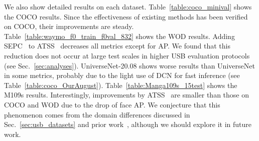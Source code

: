 \documentclass[10pt,twocolumn,letterpaper]{article}
\newcommand{\OurOrig}{UniverseNet\xspace}
\newcommand{\OurAugust}{UniverseNet-20.08\xspace}
\newcommand{\APL}{AP\xspace}
\newcommand{\MangasAbbr}{M109s\xspace}
\begin{document}
We also show detailed results on each dataset.
Table~\ref{table:coco_minival} shows the COCO results.
Since the effectiveness of existing methods has been verified on COCO,
their improvements are steady.
Table~\ref{table:waymo_f0_train_f0val_832} shows the WOD results.
Adding SEPC~\cite{SEPC_CVPR2020} to ATSS~\cite{ATSS_CVPR2020} decreases all metrics except for \APL.
We found that this reduction does not occur at large test scales in higher USB evaluation protocols (see Sec.~\ref{sec:analyses}).
\OurAugust shows worse results than \OurOrig in some metrics,
probably due to
the light use of DCN for fast inference (see Table~\ref{table:coco_OurAugust}).
Table~\ref{table:Manga109s_15test} shows the \MangasAbbr results.
Interestingly, improvements by ATSS~\cite{ATSS_CVPR2020} are smaller than those on COCO and WOD
due to the drop of face AP.
We conjecture that
this phenomenon comes from the domain differences discussed in Sec.~\ref{sec:usb_datasets} and prior work~\cite{Manga109_detection_Ogawa_2018},
although we should explore it in future work.
\end{document}
